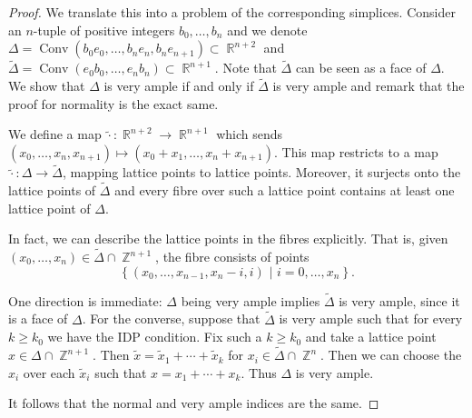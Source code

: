 \documentclass[10pt,a4paper]{amsart}
\DeclareMathOperator{\Conv}{Conv}
\DeclareMathOperator{\RR}{\mathbb{R}}
\DeclareMathOperator{\ZZ}{\mathbb{Z}}
\begin{document}
\begin{proof}
    We translate this into a problem of the corresponding simplices.
    Consider an $n$-tuple of positive integers $b_0, \dots , b_n$ and we denote $\Delta = \Conv(b_0e_{0}, \dots , b_ne_n, b_ne_{n+1}) \subset \RR^{n+2}$ and $\widetilde{\Delta} = \Conv(e_0b_0, \dots , e_nb_n) \subset \RR^{n+1}$.
    Note that $\widetilde{\Delta}$ can be seen as a face of $\Delta$.
    We show that $\Delta$ is very ample if and only if $\widetilde{\Delta}$ is very ample and remark that the proof for normality is the exact same.
    
    We define a map $\widetilde{ \cdot} : \RR^{n+2} \rightarrow \RR^{n+1}$ which sends $(x_0, \dots , x_n,x_{n+1}) \mapsto (x_0 + x_1, \dots , x_n+x_{n+1})$.
    This map restricts to a map $\widetilde{\cdot} : \Delta \rightarrow \widetilde{\Delta}$, mapping lattice points to lattice points.
    Moreover, it surjects onto the lattice points of $\widetilde{\Delta}$ and every fibre over such a lattice point contains at least one lattice point of $\Delta$.
    
    In fact, we can describe the lattice points in the fibres explicitly.
    That is, given $(x_0, \dots , x_n) \in \widetilde{\Delta}\cap \ZZ^{n+1}$, the fibre consists of points
    \[\left\{(x_0, \dots ,x_{n-1},x_{n}-i,i)\,\, | \,\, i=0, \dots , x_n \right\}.\]

    One direction is immediate: $\Delta$ being very ample implies $\widetilde{\Delta}$ is very ample, since it is a face of $\Delta$.
    For the converse, suppose that $\widetilde{\Delta}$ is very ample such that for every $k \geq k_0$ we have the IDP condition.
    Fix such a $k \geq k_0$ and take a lattice point $x \in \Delta \cap \ZZ^{n+1}$.
    Then $\widetilde{x} = \widetilde{x}_1 + \cdots + \widetilde{x}_k$ for $x_i \in \widetilde{\Delta} \cap \ZZ^n$.
    Then we can choose the $x_i$ over each $\widetilde{x}_i$ such that
    $x = x_1 + \cdots + x_k$.
    Thus $\Delta$ is very ample.

    It follows that the normal and very ample indices are the same.
\end{proof}
\end{document}
